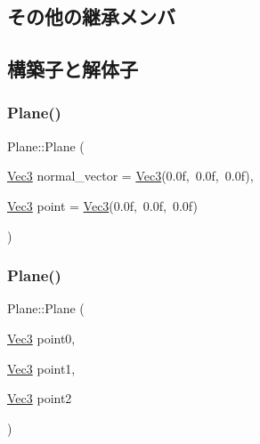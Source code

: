 \subsection*{その他の継承メンバ}


\subsection{構築子と解体子}
\mbox{\label{class_plane_a026c307dff6ed919b337f1ed7e579798}} 
\subsubsection{\texorpdfstring{Plane()}{Plane()}\hspace{0.1cm}{\footnotesize\ttfamily [1/2]}}
{\footnotesize\ttfamily Plane\+::\+Plane (\begin{DoxyParamCaption}\item[{\mbox{\hyperlink{_vector3_d_8h_ab16f59e4393f29a01ec8b9bbbabbe65d}{Vec3}}}]{normal\+\_\+vector = {\ttfamily \mbox{\hyperlink{_vector3_d_8h_ab16f59e4393f29a01ec8b9bbbabbe65d}{Vec3}}(0.0f,~0.0f,~0.0f)},  }\item[{\mbox{\hyperlink{_vector3_d_8h_ab16f59e4393f29a01ec8b9bbbabbe65d}{Vec3}}}]{point = {\ttfamily \mbox{\hyperlink{_vector3_d_8h_ab16f59e4393f29a01ec8b9bbbabbe65d}{Vec3}}(0.0f,~0.0f,~0.0f)} }\end{DoxyParamCaption})\hspace{0.3cm}{\ttfamily [inline]}}

\mbox{\label{class_plane_a9554deff9f83d09a772c15bca3d468d5}} 
\subsubsection{\texorpdfstring{Plane()}{Plane()}\hspace{0.1cm}{\footnotesize\ttfamily [2/2]}}
{\footnotesize\ttfamily Plane\+::\+Plane (\begin{DoxyParamCaption}\item[{\mbox{\hyperlink{_vector3_d_8h_ab16f59e4393f29a01ec8b9bbbabbe65d}{Vec3}}}]{point0,  }\item[{\mbox{\hyperlink{_vector3_d_8h_ab16f59e4393f29a01ec8b9bbbabbe65d}{Vec3}}}]{point1,  }\item[{\mbox{\hyperlink{_vector3_d_8h_ab16f59e4393f29a01ec8b9bbbabbe65d}{Vec3}}}]{point2 }\end{DoxyParamCaption})\hspace{0.3cm}{\ttfamily [inline]}}

